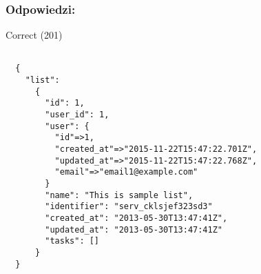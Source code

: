 \subsubsection{Odpowiedzi:}

Correct (201)
\begin{lstlisting}

  {
    "list":
      {
        "id": 1,
        "user_id": 1,
        "user": {
          "id"=>1,
          "created_at"=>"2015-11-22T15:47:22.701Z",
          "updated_at"=>"2015-11-22T15:47:22.768Z",
          "email"=>"email1@example.com"
        }
        "name": "This is sample list",
        "identifier": "serv_cklsjef323sd3"
        "created_at": "2013-05-30T13:47:41Z",
        "updated_at": "2013-05-30T13:47:41Z"
        "tasks": []
      }
  }
\end{lstlisting}
